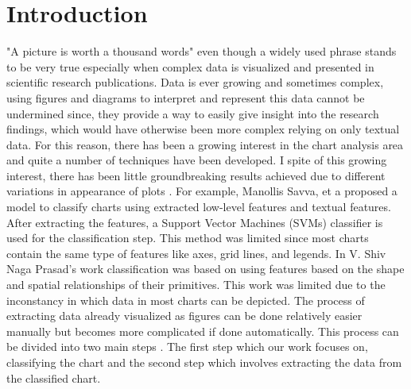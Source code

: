 \documentclass[12pt, a4paper,oneside]{report}
\begin{document}

\setcounter{tocdepth}{10}

\clearpage
\tableofcontents





\listoffigures
\listoftables

\titleformat{\chapter}{\LARGE\bfseries}{\thechapter}{1em}{}

\newpage
\chapter{Introduction}
"A picture is worth a thousand words" even though a widely used phrase stands to be very true especially when complex data is visualized and presented in scientific research publications. 
Data is ever growing and sometimes complex, using figures and diagrams to interpret and represent this data cannot be undermined since, they provide a way to easily give insight into the research findings, which would have otherwise been more complex relying on  only textual data. For this reason, there has been a growing interest in the chart analysis area and quite a number of techniques have been developed. I spite of this growing interest, there has been little groundbreaking results achieved due to different variations in appearance of plots \cite{liu2015chart}.
For example, Manollis Savva, et a \cite{savva2011revision} proposed a model to classify charts using extracted low-level features and textual features. After extracting the features, a  Support Vector Machines (SVMs) classifier is used for the classification step. This method was limited since most charts contain the same type of features like axes, grid lines, and legends.
In V. Shiv Naga Prasad's work \cite{prasad2007classifying} classification was based on using features based on the shape and spatial relationships of their primitives. This work was limited due to the inconstancy in which data in most charts can be depicted.
The process of extracting data already visualized as figures can be done relatively easier manually but becomes more complicated if done automatically. This process can be divided into two main steps \cite{savva2011revision}. The first step which our work focuses on, classifying the chart and the second step which involves extracting the data from the classified chart.
\end{document}
